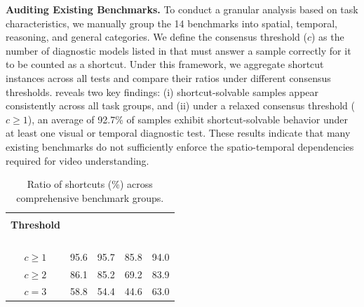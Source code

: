 \documentclass[runningheads]{llncs}
\begin{document}
{        \noindent\textbf{Auditing Existing Benchmarks.}
        To conduct a granular analysis based on task characteristics, we manually group the 14 benchmarks into spatial, temporal, reasoning, and general categories.
        We define the consensus threshold ($c$) as the number of diagnostic models listed in  that must answer a sample correctly for it to be counted as a shortcut.
        Under this framework, we aggregate shortcut instances across all tests and compare their ratios under different consensus thresholds.
         reveals two key findings: (i) shortcut-solvable samples appear consistently across all task groups, and (ii) under a relaxed consensus threshold ($c\geq1$), an average of 92.7\% of samples exhibit shortcut-solvable behavior under at least one visual or temporal diagnostic test.
        These results indicate that many existing benchmarks do not sufficiently enforce the spatio-temporal dependencies required for video understanding.
        
        \begin{table}[h]
        \vspace{-6mm}
        \caption{Ratio of shortcuts (\%) across comprehensive benchmark groups.} 
        \centering
        \label{tab:main3}
        \small
        \setlength{\tabcolsep}{6pt}
            \begin{tabular}{ccccc}
                \toprule
                \makecell{\textbf{Consensus} \\ \textbf{Threshold}} & 
                \makecell{\textbf{Spatial} \\ \cite{egoschema,vsibench,implicitqa}} & 
                \makecell{\textbf{Temporal} \\ \cite{rtvbench,tvbench,vcrbench}} & 
                \makecell{\textbf{Reasoning} \\ \cite{minerva,videoholmes,mmrv}} & 
                \makecell{\textbf{General} \\ \cite{longvideobench,mlvu,videomme,mvbench,lvbench}} \\
                \midrule
                $ c\geq 1$ & 95.6 & 95.7 & 85.8 & 94.0 \\
                $ c\geq 2$ & 86.1 & 85.2 & 69.2 & 83.9 \\
                $c=3$ & 58.8 & 54.4 & 44.6 & 63.0 \\
                \bottomrule
        \end{tabular} 
        \end{table}

}
\end{document}
